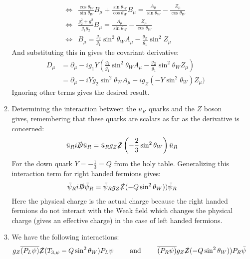 \documentclass[12pt,a4]{article}
\begin{document}
\begin{enumerate}
\begin{enumerate}
\begin{align*}
          \Leftrightarrow & \frac{\cos \theta_W}{\sin \theta_W} B_\mu + \frac{\sin \theta_W}{\cos \theta_W} B_\mu =  \frac{A_\mu}{\sin \theta_W} - \frac{Z_\mu}{\cos \theta_W}\\
          \Leftrightarrow & \frac{g_2^2 + g_1^2}{g_1 g_2} B_\mu =  \frac{A_\mu}{\sin \theta_W} - \frac{Z_\mu}{\cos \theta_W}\\
          \Leftrightarrow & B_\mu  =  \frac{g_2}{g_1}\sin^2 \theta_W A_\mu - \frac{g_Z}{g_1} \sin^2 Z_\mu
        \end{align*}
        And substituting this in gives the covariant derivative:
        \begin{align*}
          D_\mu %
                &= \partial_\mu - i g_1 Y \left(\frac{g_2}{g_1}\sin^2 \theta_W A_\mu - \frac{g_Z}{g_1} \sin^2\theta_W Z_\mu\right)\\
                &= \partial_\mu - i Y g_2\sin^2 \theta_W A_\mu - i g_Z(-Y \sin^2\theta_W) Z_\mu)
        \end{align*}
        Ignoring other terms gives the desired result.
      \item
        Determining the interaction between the $u_R$ quarks and the $Z$ boson gives, remembering that these quarks are scalars as far as the derivative is concerned:
        \begin{align*}
          \bar{u}_R i\slashed{D}  \bar{u}_R
                &= \bar{u}_R  g_Z \slashed{Z} \left(-\frac{2}{3} \sin^2\theta_W\right)  \bar{u}_R
        \end{align*}
        For the down quark $Y = -\frac{1}{3} = Q$ from the holy table.
        Generalizing this interaction term for right handed fermions gives:
        \begin{align*}
          \bar{\psi}_R i\slashed{D}  \bar{\psi}_R
                &= \bar{\psi}_R  g_Z \slashed{Z} (-Q \sin^2\theta_W) ) \bar{\psi}_R
        \end{align*}
        Here the physical charge is the actual charge because the right handed fermions do not interact with the Weak field which changes the physical charge (gives an effective charge) in the case of left handed fermions.
      \item
        We have the following interactions:
        \begin{align*}
          g_Z \overline{\left(P_L \psi\right)} \slashed{Z}  (T_{3, \psi} - Q \sin^2 \theta_W)P_L\psi \qquad \text{ and } \qquad \overline{\left(P_R \psi\right)}  g_Z \slashed{Z} (-Q \sin^2\theta_W) ) P_R\bar{\psi} 

\end{align*}
\end{enumerate}
\end{enumerate}
\end{document}
